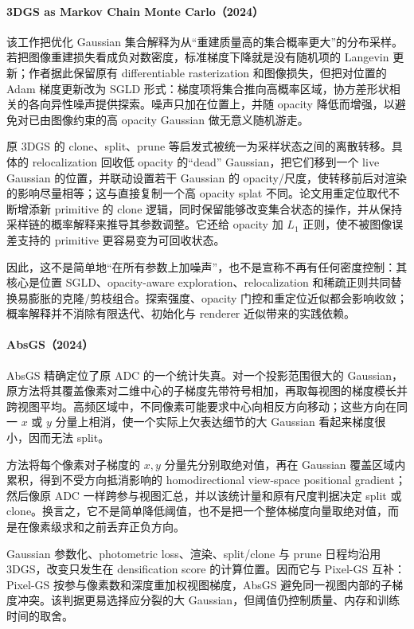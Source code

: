 \paragraph{3DGS as Markov Chain Monte Carlo（2024）\cite{2404_09591}}
该工作把优化 Gaussian 集合解释为从“重建质量高的集合概率更大”的分布采样。若把图像重建损失看成负对数密度，标准梯度下降就是没有随机项的 Langevin 更新；作者据此保留原有 differentiable rasterization 和图像损失，但把对位置的 Adam 梯度更新改为 SGLD 形式：梯度项将集合推向高概率区域，协方差形状相关的各向异性噪声提供探索。噪声只加在位置上，并随 opacity 降低而增强，以避免对已由图像约束的高 opacity Gaussian 做无意义随机游走。

原 3DGS 的 clone、split、prune 等启发式被统一为采样状态之间的离散转移。具体的 relocalization 回收低 opacity 的“dead” Gaussian，把它们移到一个 live Gaussian 的位置，并联动设置若干 Gaussian 的 opacity/尺度，使转移前后对渲染的影响尽量相等；这与直接复制一个高 opacity splat 不同。论文用重定位取代不断增添新 primitive 的 clone 逻辑，同时保留能够改变集合状态的操作，并从保持采样链的概率解释来推导其参数调整。它还给 opacity 加 $L_1$ 正则，使不被图像误差支持的 primitive 更容易变为可回收状态。

因此，这不是简单地“在所有参数上加噪声”，也不是宣称不再有任何密度控制：其核心是位置 SGLD、opacity-aware exploration、relocalization 和稀疏正则共同替换易膨胀的克隆/剪枝组合。探索强度、opacity 门控和重定位近似都会影响收敛；概率解释并不消除有限迭代、初始化与 renderer 近似带来的实践依赖。

\paragraph{AbsGS（2024）\cite{2404_10484}}
AbsGS 精确定位了原 ADC 的一个统计失真。对一个投影范围很大的 Gaussian，原方法将其覆盖像素对二维中心的子梯度先带符号相加，再取每视图的梯度模长并跨视图平均。高频区域中，不同像素可能要求中心向相反方向移动；这些方向在同一 $x$ 或 $y$ 分量上相消，使一个实际上欠表达细节的大 Gaussian 看起来梯度很小，因而无法 split。

方法将每个像素对子梯度的 $x,y$ 分量先分别取绝对值，再在 Gaussian 覆盖区域内累积，得到不受方向抵消影响的 homodirectional view-space positional gradient；然后像原 ADC 一样跨参与视图汇总，并以该统计量和原有尺度判据决定 split 或 clone。换言之，它不是简单降低阈值，也不是把一个整体梯度向量取绝对值，而是在像素级求和之前丢弃正负方向。

Gaussian 参数化、photometric loss、渲染、split/clone 与 prune 日程均沿用 3DGS，改变只发生在 densification score 的计算位置。因而它与 Pixel-GS 互补：Pixel-GS 按参与像素数和深度重加权视图梯度，AbsGS 避免同一视图内部的子梯度冲突。该判据更易选择应分裂的大 Gaussian，但阈值仍控制质量、内存和训练时间的取舍。

